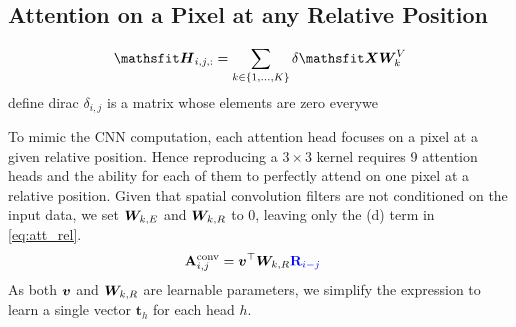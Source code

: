 \documentclass{article} %
\begin{document}
\subsection{Attention on a Pixel at any Relative Position}

\begin{align}
  \tH_{i,j,:} = \sum_{k\in\{1,\dots,K\}} \delta \tX \mW^V_k
\end{align}
define dirac $\delta_{i,j}$ is a matrix whose elements are zero everywe 

To mimic the CNN computation, each attention head focuses on a pixel at a given relative position.
Hence reproducing a $3\times 3$ kernel requires 9 attention heads and the ability for each of them to perfectly attend on
one pixel at a relative position.
Given that spatial convolution filters are not conditioned on the input data, we set ${\bm{W}}_{k, E}$ and ${\bm{W}}_{k, R}$ to 0, leaving only the (d) term in \eqref{eq:att_rel}.
%
\begin{align}
  \mathbf{A}_{i, j}^{\mathrm{conv}} &= {\bm{v}}^{\top} {\bm{W}}_{k, R} {\color{blue} \mathbf{R}_{i - j}}
\end{align}
As both ${\bm{v}}$ and ${\bm{W}}_{k, R}$ are learnable parameters, we simplify the expression to learn a single vector $\mathbf{t}_h$ for each head $h$.
\end{document}
